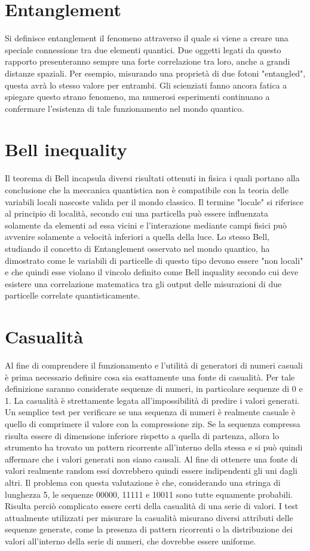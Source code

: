 \section{Entanglement}
Si definisce entanglement il fenomeno attraverso il quale si viene a creare una speciale connessione tra due elementi quantici. Due oggetti legati da questo rapporto presenteranno sempre una forte correlazione tra loro, anche a grandi distanze spaziali. Per esempio, misurando una proprietà di due fotoni "entangled", questa avrà lo stesso valore per entrambi. Gli scienziati fanno ancora fatica a spiegare questo strano fenomeno, ma numerosi esperimenti continuano a confermare l'esistenza di tale funzionamento nel mondo quantico.

\section{Bell inequality}
Il teorema di Bell incapsula diversi risultati ottenuti in fisica i quali portano alla conclusione che la meccanica quantistica non è compatibile con la teoria delle variabili locali nascoste valida per il mondo classico. Il termine "locale" si riferisce al principio di località, secondo cui una particella può essere influenzata solamente da elementi ad essa vicini e l'interazione mediante campi fisici può avvenire solamente a velocità inferiori a quella della luce. Lo stesso Bell, studiando il concetto di Entanglement osservato nel mondo quantico, ha dimostrato come le variabili di particelle di questo tipo devono essere "non locali" e che quindi esse violano il vincolo definito come Bell inquality secondo cui deve esistere una correlazione matematica tra gli output delle misurazioni di due particelle correlate quantisticamente.

\section{Casualità}
Al fine di comprendere il funzionamento e l'utilità di generatori di numeri casuali è prima necessario definire cosa sia esattamente una fonte di casualità. Per tale definizione saranno considerate sequenze di numeri, in particolare sequenze di 0 e 1. La casualità è strettamente legata all'impossibilità di predire i valori generati. Un semplice test per verificare se una sequenza di numeri è realmente casuale è quello di comprimere il valore con la compressione zip. Se la sequenza compressa risulta essere di dimensione inferiore rispetto a quella di partenza, allora lo strumento ha trovato un pattern ricorrente all'interno della stessa e si può quindi affermare che i valori generati non siano causali. Al fine di ottenere una fonte di valori realmente random essi dovrebbero quindi essere indipendenti gli uni dagli altri. Il problema con questa valutazione è che, considerando una stringa di lunghezza 5, le sequenze 00000, 11111 e 10011 sono tutte equamente probabili. Risulta perciò complicato essere certi della casualità di una serie di valori. I test attualmente utilizzati per misurare la casualità misurano diversi attributi delle sequenze generate, come la presenza di pattern ricorrenti o la distribuzione dei valori all'interno della serie di numeri, che dovrebbe essere uniforme.